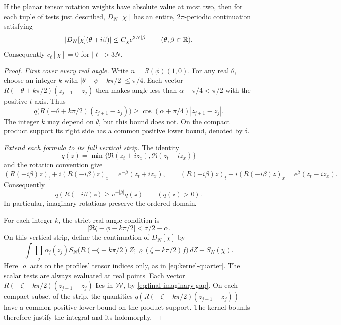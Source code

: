 \begin{proposition}\label{prop:final-growth}
If the planar tensor rotation weights have absolute value at most two,
then for each tuple of tests just described, $D_N[\chi]$ has an entire,
$2\pi$-periodic continuation satisfying
\begin{equation}\label{eq:final-growth}
 |D_N[\chi](\theta+i\beta)|\le C_\chi e^{3N|\beta|}
 \qquad(\theta,\beta\in\mathbb{R}).
\end{equation}
Consequently $c_\ell[\chi]=0$ for $|\ell|>3N$.
\end{proposition}

\begin{proof}
\emph{First cover every real angle.}
Write $n=R(\phi)(1,0)$. For any real $\theta$, choose an integer $k$ with
$|\theta-\phi-k\pi/2|\le\pi/4$. Each vector
$R(-\theta+k\pi/2)(z_{j+1}-z_j)$ then makes angle less than
$\alpha+\pi/4<\pi/2$ with the positive $t$-axis.
Thus
\begin{equation}\label{eq:final-real-gap}
 q\bigl(R(-\theta+k\pi/2)(z_{j+1}-z_j)\bigr)
 \ge \cos(\alpha+\pi/4)|z_{j+1}-z_j|.
\end{equation}
The integer $k$ may depend on $\theta$, but this bound does not. On the compact
product support its right side has a common positive lower bound,
denoted by $\delta$.

\emph{Extend each formula to its full vertical strip.}
The identity
\[
 q(z)=\min\{\Re(z_t+iz_x),\Re(z_t-iz_x)\}
\]
and the rotation convention give
\[
 (R(-i\beta)z)_t+i(R(-i\beta)z)_x=e^{-\beta}(z_t+iz_x),
 \qquad
 (R(-i\beta)z)_t-i(R(-i\beta)z)_x=e^{\beta}(z_t-iz_x).
\]
Consequently
\begin{equation}\label{eq:final-imaginary-gap}
 q(R(-i\beta)z)\ge e^{-|\beta|}q(z)\qquad(q(z)>0).
\end{equation}
In particular, imaginary rotations preserve the ordered domain.

For each integer $k$, the strict real-angle condition is
\begin{equation}\label{eq:final-strips}
 |\Re\zeta-\phi-k\pi/2|<\pi/2-\alpha.
\end{equation}
On this vertical strip, define the continuation of $D_N[\chi]$ by
\begin{equation}\label{eq:final-chart}
 \int\prod_j\alpha_j(z_j)
 S_N\bigl(R(-\zeta+k\pi/2)Z;
              \varrho(\zeta-k\pi/2)f\bigr)\,dZ-S_N(\chi).
\end{equation}
Here $\varrho$ acts on the profiles' tensor indices only, as in
\eqref{eq:kernel-quarter}.
The scalar tests are always evaluated at real points. Each vector
$R(-\zeta+k\pi/2)(z_{j+1}-z_j)$ lies in $\mathcal{W}$, by
\eqref{eq:final-imaginary-gap}. On each compact subset of the strip,
the quantities $q(R(-\zeta+k\pi/2)(z_{j+1}-z_j))$ have a common
positive lower bound on the product support. The kernel bounds
therefore justify the integral and its holomorphy.


\end{proof}
